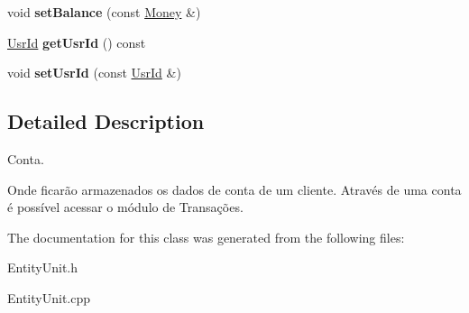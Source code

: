 \begin{DoxyCompactItemize}
\item 
\hypertarget{classAccount_a0c54b27c54fd64b93d31aecdf7f3f302}{void {\bfseries set\-Balance} (const \hyperlink{classMoney}{Money} \&)}\label{classAccount_a0c54b27c54fd64b93d31aecdf7f3f302}

\item 
\hypertarget{classAccount_a59a83e5c5142f79402e79a8d42b36aed}{\hyperlink{classUsrId}{Usr\-Id} {\bfseries get\-Usr\-Id} () const }\label{classAccount_a59a83e5c5142f79402e79a8d42b36aed}

\item 
\hypertarget{classAccount_a97146ede9747001294bcd41c74abd67a}{void {\bfseries set\-Usr\-Id} (const \hyperlink{classUsrId}{Usr\-Id} \&)}\label{classAccount_a97146ede9747001294bcd41c74abd67a}

\end{DoxyCompactItemize}


\subsection{Detailed Description}
Conta. 

Onde ficarão armazenados os dados de conta de um cliente. Através de uma conta é possível acessar o módulo de Transações. 

The documentation for this class was generated from the following files\-:\begin{DoxyCompactItemize}
\item 
Entity\-Unit.\-h\item 
Entity\-Unit.\-cpp\end{DoxyCompactItemize}
